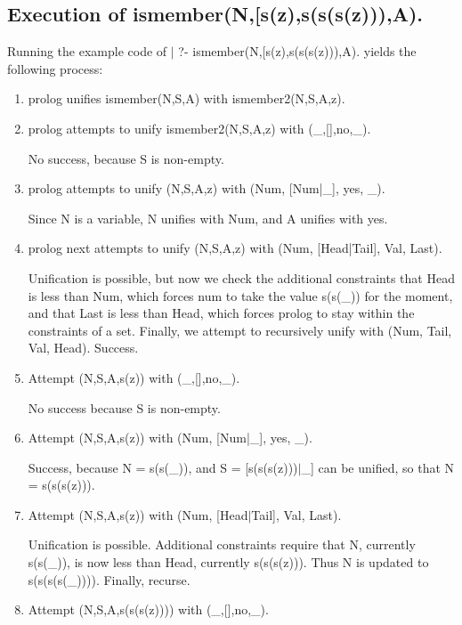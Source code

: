 \documentclass{article}
\begin{document}
\subsection{Execution of ismember(N,[s(z),s(s(s(z))),A).}
Running the example code of $\vert$ ?- ismember(N,[s(z),s(s(s(z))),A). yields the following process:
\begin{enumerate}

    \item  prolog unifies ismember(N,S,A) with ismember2(N,S,A,z).

    \item  prolog attempts to unify ismember2(N,S,A,z) with (\_,[],no,\_).

         No success, because S is non-empty.

    \item  prolog attempts to unify (N,S,A,z) with (Num, [Num|\_], yes, \_).

         Since N is a variable, N unifies with Num, and A unifies with yes.

    \item  prolog next attempts to unify (N,S,A,z) with (Num, [Head|Tail], Val, Last).

         Unification is possible, but now we check the additional constraints that Head is less than Num, which forces num to take the value s(s(\_)) for the moment, and that Last is less than Head, which forces prolog to stay within the constraints of a set. Finally, we attempt to recursively unify with (Num, Tail, Val, Head). Success.

    \item  Attempt (N,S,A,s(z)) with (\_,[],no,\_).

         No success because S is non-empty.

    \item   Attempt (N,S,A,s(z)) with (Num, [Num|\_], yes, \_).

         Success, because N = s(s(\_)), and S = [s(s(s(z)))$\vert$\_] can be unified, so that N = s(s(s(z))).

    \item   Attempt (N,S,A,s(z)) with (Num, [Head$\vert$Tail], Val, Last).

         Unification is possible. Additional constraints require that N, currently s(s(\_)), is now less than Head, currently s(s(s(z))). Thus N is updated to s(s(s(s(\_)))). Finally, recurse.

    \item   Attempt (N,S,A,s(s(s(z)))) with (\_,[],no,\_).


\end{enumerate}
\end{document}
